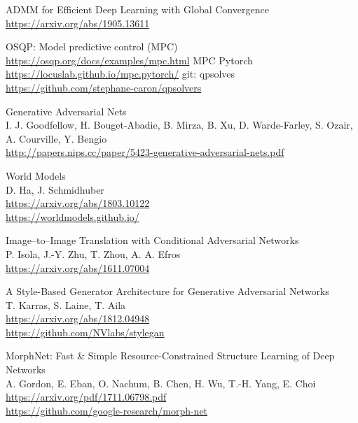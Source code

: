 \documentclass{article}
\begin{document}
\begin{thebibliography}{1}
        ADMM for Efficient Deep Learning with Global Convergence
        \\
        \url{https://arxiv.org/abs/1905.13611}

        OSQP: Model predictive control (MPC)
        \\
        \url{https://osqp.org/docs/examples/mpc.html}
        MPC Pytorch
        \\
        \url{https://locuslab.github.io/mpc.pytorch/}
        git: qpsolves
        \\
        \url{https://github.com/stephane-caron/qpsolvers}

        Generative Adversarial Nets
        \\
        I. J. Goodfellow, H. Bouget-Abadie, B. Mirza, B. Xu, D. Warde-Farley,
        S. Ozair, A. Courville, Y. Bengio
        \\
        \url{http://papers.nips.cc/paper/5423-generative-adversarial-nets.pdf}

        World Models
        \\
        D. Ha, J. Schmidhuber
        \\
        \url{https://arxiv.org/abs/1803.10122}
        \\
        \url{https://worldmodels.github.io/}

        Image--to--Image Translation with Conditional Adversarial Networks
        \\ 
        P. Isola, J.-Y. Zhu, T. Zhou, A. A. Efros
        \\
        \url{https://arxiv.org/abs/1611.07004}

        A Style-Based Generator Architecture for Generative Adversarial Networks
        \\
        T. Karras, S. Laine, T. Aila
        \\
        \url{https://arxiv.org/abs/1812.04948}
        \\
        \url{https://github.com/NVlabs/stylegan}
    
        MorphNet: Fast \& Simple Resource-Constrained Structure Learning of Deep Networks
        \\
        A. Gordon, E. Eban, O. Nachum, B. Chen, H. Wu, T.-H. Yang, E. Choi
        \\
        \url{https://arxiv.org/pdf/1711.06798.pdf}
        \\
        \url{https://github.com/google-research/morph-net}


\end{thebibliography}
\end{document}
